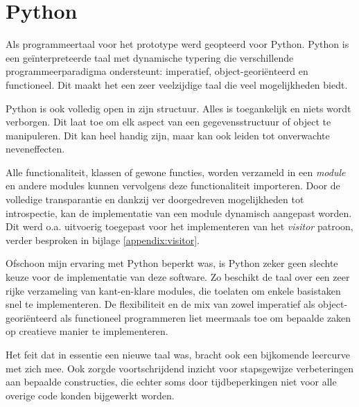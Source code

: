 
\section{Python}
\label{section:devel-python}

Als programmeertaal voor het prototype werd geopteerd voor Python. Python is
een ge\"interpreteerde taal met dynamische typering die verschillende
programmeerparadigma ondersteunt: imperatief, object-geori\"enteerd en
functioneel. Dit maakt het een zeer veelzijdige taal die veel mogelijkheden
biedt.

Python is ook volledig open in zijn structuur. Alles is toegankelijk en niets
wordt verborgen. Dit laat toe om elk aspect van een gegevensstructuur of object
te manipuleren. Dit kan heel handig zijn, maar kan ook leiden tot onverwachte
neveneffecten.

Alle functionaliteit, klassen of gewone functies, worden verzameld in een
\emph{module} en andere modules kunnen vervolgens deze functionaliteit
importeren. Door de volledige transparantie en dankzij ver doorgedreven
mogelijkheden tot introspectie, kan de implementatie van een module dynamisch
aangepast worden. Dit werd o.a. uitvoerig toegepast voor het implementeren van
het \emph{visitor} patroon, verder besproken in bijlage \ref{appendix:visitor}.

Ofschoon mijn ervaring met Python beperkt was, is Python zeker geen slechte
keuze voor de implementatie van deze software. Zo beschikt de taal over een
zeer rijke verzameling van kant-en-klare modules, die toelaten om enkele
basistaken snel te implementeren. De flexibiliteit en de mix van zowel
imperatief als object-geori\"enteerd als functioneel programmeren liet
meermaals toe om bepaalde zaken op creatieve manier te implementeren.

Het feit dat in essentie een nieuwe taal was, bracht ook een bijkomende
leercurve met zich mee. Ook zorgde voortschrijdend inzicht voor stapsgewijze
verbeteringen aan bepaalde constructies, die echter soms door tijdbeperkingen
niet voor alle overige code konden bijgewerkt worden.
